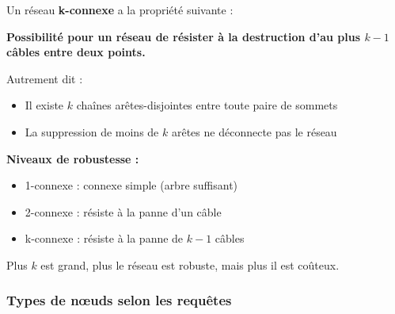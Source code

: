 \documentclass[12pt,a4paper]{article}
\begin{document}
\begin{definition}
Un réseau \textcolor{titrebleu}{\textbf{k-connexe}} a la propriété suivante :

\textbf{Possibilité pour un réseau de résister à la destruction d'au plus $k-1$ câbles entre deux points.}

Autrement dit :
\begin{itemize}
    \item Il existe $k$ chaînes arêtes-disjointes entre toute paire de sommets
    \item La suppression de moins de $k$ arêtes ne déconnecte pas le réseau
\end{itemize}
\end{definition}

\begin{astuce}
\textbf{Niveaux de robustesse :}
\begin{itemize}
    \item \textcolor{defvert}{1-connexe} : connexe simple (arbre suffisant)
    \item \textcolor{titrebleu}{2-connexe} : résiste à la panne d'un câble
    \item \textcolor{algoviolet}{k-connexe} : résiste à la panne de $k-1$ câbles
\end{itemize}

Plus $k$ est grand, plus le réseau est robuste, mais plus il est coûteux.
\end{astuce}

\subsubsection{Types de nœuds selon les requêtes}
\end{document}
